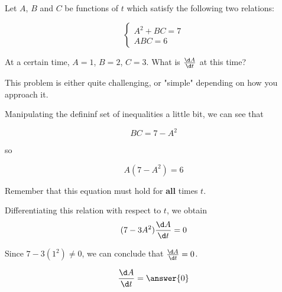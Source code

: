 \documentclass{ximera}
\author{Steven Gubkin}
\begin{document}
\begin{exercise}



Let $A$, $B$ and $C$ be functions of $t$ which satisfy the following two relations:

\[
\begin{cases}
	A^2+BC = 7\\
	ABC = 6 
\end{cases}
\]

At a certain time, $A = 1$, $B=2$, $C=3$.  What is $\frac{\d A}{\d t}$ at this time?

\begin{warning}
	This problem is either quite challenging, or "simple" depending on how you approach it.
\end{warning}

\begin{hint}
	Manipulating the defininf set of inequalities a little bit, we can see that

\[
BC = 7-A^2
\]

so

\[
A(7-A^2) = 6
\]

Remember that this equation must hold for \textbf{all} times $t$.
\end{hint}

\begin{hint}
	Differentiating this relation with respect to $t$, we obtain
\[
(7-3A^2)\frac{\d A}{\d t} = 0
\]
\end{hint}


\begin{hint}
	Since $7-3(1^2) \neq 0 $, we can conclude that $\frac{\d A}{\d t} = 0$.
\end{hint}

\begin{prompt}
	\[
\frac{\d A}{\d t} = \answer{0}
	\]
\end{prompt}

\end{exercise}
\end{document}
